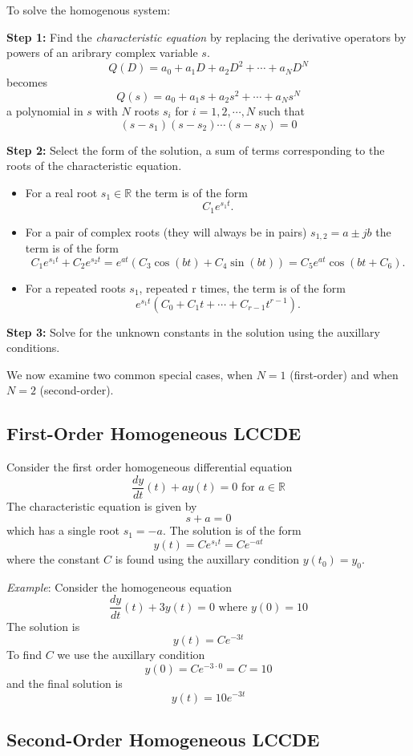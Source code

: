 To solve the homogenous system:

\textbf{Step 1:} Find the \emph{characteristic equation} by replacing the derivative operators by powers of an aribrary complex variable $s$.
\[
Q(D) = a_0 + a_1D + a_2D^2 + \cdots + a_ND^N
\]
becomes
\[
Q(s) = a_0 + a_1s + a_2s^2 + \cdots + a_Ns^N
\]
a polynomial in $s$ with $N$ roots $s_i$ for $i = 1, 2, \cdots, N$ such that
\[
(s - s_1)(s-s_2)\cdots(s-s_N) = 0
\]

\textbf{Step 2:} Select the form of the solution, a sum of terms corresponding to the roots of the characteristic equation.

\begin{itemize}
\item For a real root $s_1\in \mathbb{R}$ the term is of the form
  \[
  C_1 e^{s_1 t}.
  \]
\item For a pair of complex roots (they will always be in pairs) $s_{1,2} = a \pm jb$ the term is of the form
  \[
  C_1 e^{s_1 t} + C_2 e^{s_2 t} = e^{a t}\left(C_3\cos(bt) + C_4\sin(bt)\right) = C_5 e^{a t}\cos(bt + C_6).
  \]
\item For a repeated roots $s_1$, repeated r times, the term is of the form
  \[
  e^{s_1 t} (C_0 + C_1 t + \cdots + C_{r-1} t^{r-1}).\]
\end{itemize}

\textbf{Step 3:} Solve for the unknown constants in the solution using the auxillary conditions. 

We now examine two common special cases, when $N=1$ (first-order) and when $N=2$ (second-order).

\subsection{First-Order Homogeneous LCCDE}

Consider the first order homogeneous differential equation
\[
\frac{dy}{dt}(t) + ay(t) = 0 \mbox{ for } a \in \mathbb{R}
\]
The characteristic equation is given by
\[
s + a = 0
\]
which has a single root $s_1 = -a$. The solution is of the form
\[
y(t) = Ce^{s_1 t} = Ce^{-a t} 
\]
where the constant $C$ is found using the auxillary condition $y(t_0) = y_0$.

\textit{Example}: Consider the homogeneous equation
\[
\frac{dy}{dt}(t) + 3y(t) = 0 \mbox{ where } y(0) = 10
\]
The solution is
\[
y(t) = Ce^{-3 t} 
\]
To find $C$ we use the auxillary condition
\[
y(0) = Ce^{-3 \cdot 0} = C = 10
\]
and the final solution is
\[
y(t) = 10e^{-3 t} 
\]
\subsection{Second-Order Homogeneous LCCDE}

